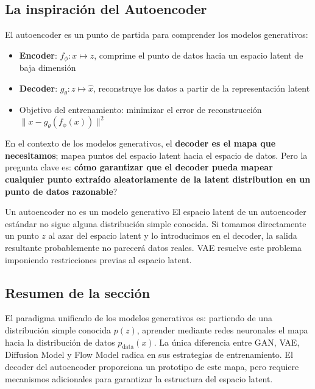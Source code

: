 \subsection{La inspiración del Autoencoder}

El autoencoder es un punto de partida para comprender los modelos generativos:

\begin{itemize}
    \item \textbf{Encoder}: $f_\phi: x \mapsto z$, comprime el punto de datos hacia un espacio latent de baja dimensión
    \item \textbf{Decoder}: $g_\theta: z \mapsto \hat{x}$, reconstruye los datos a partir de la representación latent
    \item Objetivo del entrenamiento: minimizar el error de reconstrucción $\|x - g_\theta(f_\phi(x))\|^2$
\end{itemize}

En el contexto de los modelos generativos, el \textbf{decoder es el mapa que necesitamos}; mapea puntos del espacio latent hacia el espacio de datos. Pero la pregunta clave es: \textbf{cómo garantizar que el decoder pueda mapear cualquier punto extraído aleatoriamente de la latent distribution en un punto de datos razonable}?

\begin{warningbox}{Un autoencoder no es un modelo generativo}
El espacio latent de un autoencoder estándar no sigue alguna distribución simple conocida. Si tomamos directamente un punto $z$ al azar del espacio latent y lo introducimos en el decoder, la salida resultante probablemente no parecerá datos reales. VAE resuelve este problema imponiendo restricciones previas al espacio latent.
\end{warningbox}

\subsection{Resumen de la sección}

El paradigma unificado de los modelos generativos es: partiendo de una distribución simple conocida $p(z)$, aprender mediante redes neuronales el mapa hacia la distribución de datos $p_{\text{data}}(x)$. La única diferencia entre GAN, VAE, Diffusion Model y Flow Model radica en sus estrategias de entrenamiento. El decoder del autoencoder proporciona un prototipo de este mapa, pero requiere mecanismos adicionales para garantizar la estructura del espacio latent.

\newpage
